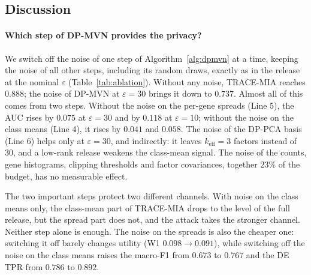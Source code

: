 \documentclass{article}
\newcommand{\dpmvn}{DP-MVN}
\newcommand{\ours}{TRACE-MIA}
\begin{document}
\subsection{Discussion}

\paragraph{Which step of \dpmvn{} provides the privacy?}
We switch off the noise of one step of Algorithm~\ref{alg:dpmvn} at a time, keeping the noise of all other steps, including its random draws, exactly as in the release at the nominal $\varepsilon$ (Table~\ref{tab:ablation}). Without any noise, \ours{} reaches $0.888$; the noise of \dpmvn{} at $\varepsilon=30$ brings it down to $0.737$. Almost all of this comes from two steps. Without the noise on the per-gene spreads (Line 5), the AUC rises by $0.075$ at $\varepsilon=30$ and by $0.118$ at $\varepsilon=10$; without the noise on the class means (Line 4), it rises by $0.041$ and $0.058$. The noise of the DP-PCA basis (Line 6) helps only at $\varepsilon=30$, and indirectly: it leaves $k_\mathrm{eff}=3$ factors instead of $30$, and a low-rank release weakens the class-mean signal. The noise of the counts, gene histograms, clipping thresholds and factor covariances, together $23\%$ of the budget, has no measurable effect.

The two important steps protect two different channels. With noise on the class means only, the class-mean part of \ours{} drops to the level of the full release, but the spread part does not, and the attack takes the stronger channel. Neither step alone is enough. The noise on the spreads is also the cheaper one: switching it off barely changes utility (W1 $0.098\to0.091$), while switching off the noise on the class means raises the macro-F1 from $0.673$ to $0.767$ and the DE TPR from $0.786$ to $0.892$.
\end{document}
